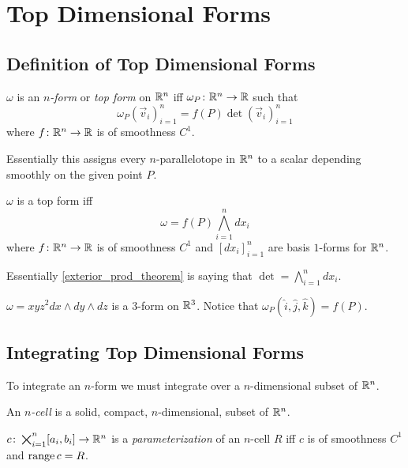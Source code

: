 \documentclass[notes]{subfiles}
\begin{document}
\setcounter{section}{5}
\section{Top Dimensional Forms}
\subsection{Definition of Top Dimensional Forms}

\begin{definition}
    $\omega$ is an \textit{$n$-form} or \textit{top form} on $\mathbb{R}^n$ iff %
    $\omega_P\colon \mathbb{R}^n \to \mathbb{R}$ such that
    \[
        \omega_P(\vec{v}_i)_{i = 1}^n = f(P)\det(\vec{v}_i)_{i = 1}^n
    \]
    where $f\colon \mathbb{R}^n \to \mathbb{R}$ is of smoothness $C^1$.
\end{definition}

Essentially this assigns every $n$-parallelotope in $\mathbb{R}^n$ to a scalar depending smoothly on the given point $P$.

\begin{lemma} \label{exterior_prod_theorem}
    $\omega$ is a top form iff
    \[
        \omega = f(P) \bigwedge_{i = 1}^n dx_i
    \]
    where $f\colon \mathbb{R}^n \to \mathbb{R}$ is of smoothness $C^1$ and $[dx_i]_{i = 1}^n$ are basis $1$-forms for $\mathbb{R}^n$.
\end{lemma}

Essentially \cref{exterior_prod_theorem} is saying that $\det = \bigwedge_{i = 1}^n dx_i$.

\begin{example}
    $\omega = xyz^2 dx \wedge dy \wedge dz$ is a $3$-form on $\mathbb{R}^3$. Notice that $\omega_P(\hat{i}, \hat{j}, \hat{k}) = f(P)$.
\end{example}

\subsection{Integrating Top Dimensional Forms}
To integrate an $n$-form we must integrate over a $n$-dimensional subset of $\mathbb{R}^n$.

\begin{definition}[$n$-Cell]
    An \textit{$n$-cell} is a solid, compact, $n$-dimensional, subset of $\mathbb{R}^n$.
\end{definition}

\begin{definition}
    $c\colon \bigtimes_{i = 1}^n [a_i, b_i] \to \mathbb{R}^n$ is a \textit{parameterization} of an $n$-cell $R$ iff $c$ is of smoothness $C^1$ and $\operatorname{range} c = R$.
\end{definition}
\end{document}
